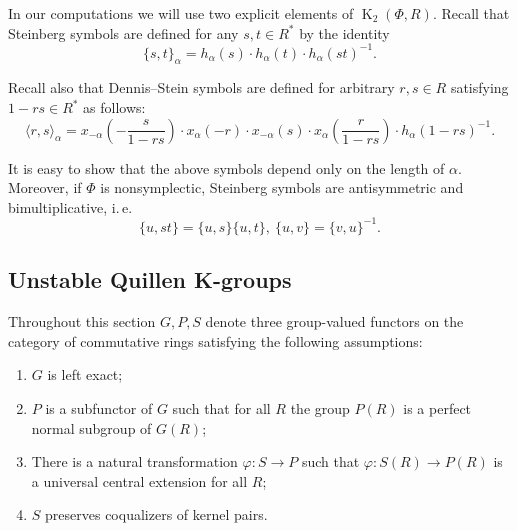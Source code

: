 \documentclass[oneside, 10pt]{amsart}
\theoremstyle{remark}
\theoremstyle{definition}
\DeclareMathOperator{\K}{K}
\numberwithin{equation}{section}
\begin{document}
In our computations we will use two explicit elements of $\K_2(\Phi, R)$. Recall that Steinberg symbols are defined for any $s, t \in R^*$ by the identity
\[ \{ s, t \}_\alpha = h_\alpha(s) \cdot h_\alpha(t) \cdot h_\alpha(st)^{-1}. \]

Recall also that Dennis--Stein symbols are defined for arbitrary $r, s\in R$ satisfying $1 - rs \in R^*$ as follows:
\begin{equation} \label{eq:dennis-stein}
 \langle r,s \rangle _ \alpha = x_{-\alpha}\left(-\frac{s}{1 - rs}\right) \cdot x_{\alpha}(-r) \cdot x_{-\alpha}(s) \cdot x_{\alpha}\left(\frac{r}{1-rs}\right) \cdot h_{\alpha}(1 - rs)^{-1}.
\end{equation} 

It is easy to show that the above symbols depend only on the length of $\alpha$.
Moreover, if $\Phi$ is nonsymplectic, Steinberg symbols are antisymmetric and bimultiplicative, i.\,e. \begin{equation} \label{eq:symbol-properties} \{ u, st \} = \{ u, s\} \{ u, t \}, \ \{ u, v \} = \{ v, u\}^{-1}. \end{equation}

\subsection{Unstable Quillen K-groups}
\begin{comment}
In order to better understand $C(\Phi, R, I)$  we would like to continue the sequence~\eqref{eq:relative-St} to the left. 
Thus we need to work with unstable $\K_3$-functors a la Quillen (cf.~\cite{Pa89}).
\end{comment}
Throughout this section $G, P, S$ denote three group-valued functors on the category of commutative rings satisfying the following assumptions:
\begin{enumerate}
 \item\label{req:left-exact} $G$ is left exact;
 \item $P$ is a subfunctor of $G$ such that for all $R$ the group $P(R)$ is a perfect normal subgroup of $G(R)$;
 \item There is a natural transformation $\varphi \colon S \to P$ such that $ \varphi \colon S(R) \to P(R)$ is a universal central extension for all $R$;
 \item \label{req:coeq} $S$ preserves coqualizers of kernel pairs.
\end{enumerate}
\end{document}
